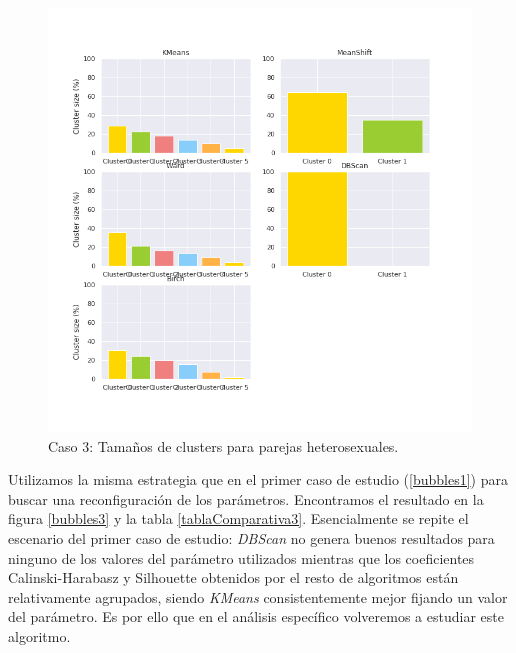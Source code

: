 \documentclass[11pt,a4paper]{article}
\begin{document}
	\begin{figure}[] 
		\centering
		\includegraphics[scale=0.4]{../Caso3/hetero/clusters}
		\caption{Caso 3: Tamaños de clusters para parejas heterosexuales.} \label{clusters3}
	\end{figure}

	Utilizamos la misma estrategia que en el primer caso de estudio (\ref{bubbles1}) para buscar una reconfiguración de los parámetros. Encontramos el resultado en la figura \ref{bubbles3} y la tabla \ref{tablaComparativa3}. Esencialmente se repite el escenario del primer caso de estudio: \emph{DBScan} no genera buenos resultados para ninguno de los valores del parámetro utilizados mientras que los coeficientes Calinski-Harabasz y Silhouette obtenidos por el resto de algoritmos están relativamente agrupados, siendo \emph{KMeans} consistentemente mejor fijando un valor del parámetro. Es por ello que en el análisis específico volveremos a estudiar este algoritmo. \\
	
\end{document}

